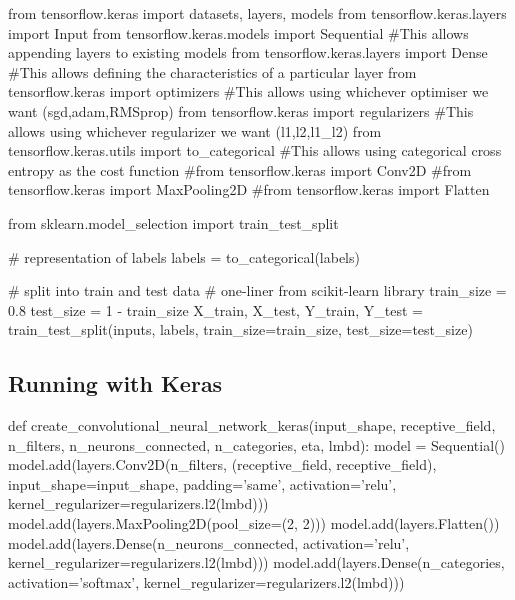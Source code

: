 \documentclass[%
oneside,                 %
final,                   %
10pt]{article}
\begin{document}
\bpycod
from tensorflow.keras import datasets, layers, models
from tensorflow.keras.layers import Input
from tensorflow.keras.models import Sequential      #This allows appending layers to existing models
from tensorflow.keras.layers import Dense           #This allows defining the characteristics of a particular layer
from tensorflow.keras import optimizers             #This allows using whichever optimiser we want (sgd,adam,RMSprop)
from tensorflow.keras import regularizers           #This allows using whichever regularizer we want (l1,l2,l1_l2)
from tensorflow.keras.utils import to_categorical   #This allows using categorical cross entropy as the cost function
#from tensorflow.keras import Conv2D
#from tensorflow.keras import MaxPooling2D
#from tensorflow.keras import Flatten

from sklearn.model_selection import train_test_split

# representation of labels
labels = to_categorical(labels)

# split into train and test data
# one-liner from scikit-learn library
train_size = 0.8
test_size = 1 - train_size
X_train, X_test, Y_train, Y_test = train_test_split(inputs, labels, train_size=train_size,
                                                    test_size=test_size)

\epycod


\subsection{Running with Keras}




























\bpycod
def create_convolutional_neural_network_keras(input_shape, receptive_field,
                                              n_filters, n_neurons_connected, n_categories,
                                              eta, lmbd):
    model = Sequential()
    model.add(layers.Conv2D(n_filters, (receptive_field, receptive_field), input_shape=input_shape, padding='same',
              activation='relu', kernel_regularizer=regularizers.l2(lmbd)))
    model.add(layers.MaxPooling2D(pool_size=(2, 2)))
    model.add(layers.Flatten())
    model.add(layers.Dense(n_neurons_connected, activation='relu', kernel_regularizer=regularizers.l2(lmbd)))
    model.add(layers.Dense(n_categories, activation='softmax', kernel_regularizer=regularizers.l2(lmbd)))
    
\end{document}
